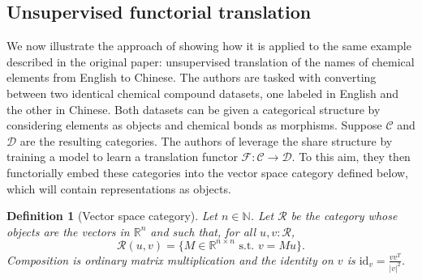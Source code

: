\documentclass[11pt,a4paper,openright,twoside]{report}
\newcounter{mycounter}
\theoremstyle{plain}
\newtheorem{definition}[mycounter]{Definition}
\theoremstyle{definition}
\begin{document}
\subsection{Unsupervised functorial translation}


We now illustrate the approach of \cite{sheshmani2021categorical} showing how it is applied to the same example described in the original paper: unsupervised translation of the names of chemical elements from English to Chinese. The authors are tasked with converting between two identical chemical compound datasets, one labeled in English and the other in Chinese. Both datasets can be given a categorical structure by considering elements as objects and chemical bonds as morphisms. Suppose $\mathcal{C}$ and $\mathcal{D}$ are the resulting categories. The authors of \cite{sheshmani2021categorical} leverage the share structure by training a model to learn a translation functor $\mathcal{F}: \mathcal{C} \to \mathcal{D}$. To this aim, they then functorially embed these categories into the vector space category defined below, which will contain representations as objects.


\begin{definition}[Vector space category]
  \label{def: vecspacecat}
  Let $n \in \mathbb{N}$. Let $\mathcal{R}$ be the category whose objects are the vectors in $\mathbb{R}^n$ and such that, for all $u,v :\mathcal{R}$, 
  \[\mathcal{R}(u, v) = \{M \in \mathbb{R}^{n \times n} \text{ s.t. } v = Mu\}.\]
  Composition is ordinary matrix multiplication and the identity on $v$ is $\mathrm{id}_v = \frac{vv^T}{|v|^2}$.
\end{definition}
\end{document}

